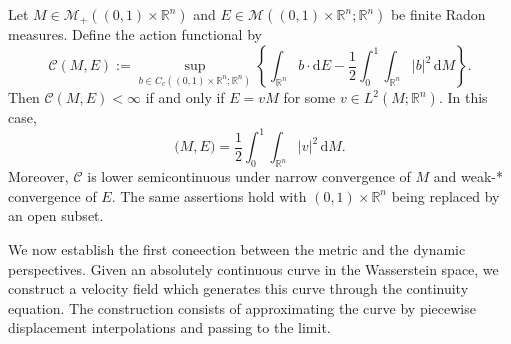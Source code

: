 \begin{lemma}
Let $M\in\mathcal{M}_+((0,1)\times \mathbb{R}^n)$ and $E\in\mathcal{M}((0,1)\times \mathbb{R}^n;\mathbb{R}^n)$ be finite Radon measures. Define the action functional by
$$
\mathcal{C}(M,E) := \sup_{b\in C_c((0,1)\times \mathbb{R}^n;\mathbb{R}^n)}\left\{\int_{\mathbb{R}^n} b\cdot \mathrm dE - \frac{1}{2}\int_0^1\int_{\mathbb{R}^n} |b|^2\,\mathrm dM\right\}.
$$
Then $\mathcal{C}(M,E)<\infty$ if and only if $E=vM$ for some $v\in L^2(M; \mathbb{R}^n)$. In this case,
$$
\mathcal{(}M,E)=\frac{1}{2}\int_0^1\int_{\mathbb{R}^n} |v|^2\,\mathrm dM.
$$
Moreover, $\mathcal{C}$ is lower semicontinuous under narrow convergence of $M$ and weak-* convergence of $E$. The same assertions hold with $(0,1)\times \mathbb{R}^n$ being replaced by an open subset.
\end{lemma}

We now establish the first coneection between the metric and the dynamic perspectives. Given an absolutely continuous curve in the Wasserstein space, we construct a velocity field which generates this curve through the continuity equation. The construction consists of approximating the curve by piecewise displacement interpolations and passing to the limit. 

